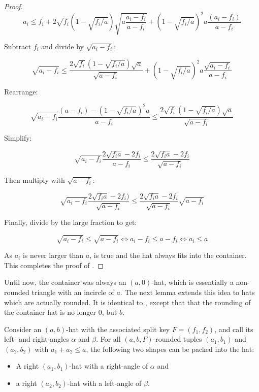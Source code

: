 \documentclass[a4paper,style=print,oneside,bibliography=totoc,nexus,lnum,extramargin]{tubsbook}
\begin{document}
\begin{proof}
    $$a_i \le f_i + 2\sqrt{f_i}(1-\sqrt{f_i/a})\sqrt{a\frac{a_i-f_i}{a-f_i}} + (1-\sqrt{f_i/a})^2a\frac{(a_i-f_i)}{a-f_i}$$

    Subtract $f_i$ and divide by $\sqrt{a_i-f_i}$:

    $$\sqrt{a_i-f_i} \le \frac{2\sqrt{f_i}(1-\sqrt{f_i/a})\sqrt{a}}{\sqrt{a-f_i}} + (1-\sqrt{f_i/a})^2a\frac{\sqrt{a_i-f_i}}{a-f_i}$$

    Rearrange:

    $$\sqrt{a_i-f_i}\frac{(a-f_i)-(1-\sqrt{f_i/a})^2a}{a-f_i} \le \frac{2\sqrt{f_i}(1-\sqrt{f_i/a})\sqrt{a}}{\sqrt{a-f_i}}$$

    Simplify:

    $$\sqrt{a_i-f_i}\frac{2\sqrt{f_ia}-2f_i}{a-f_i} \le \frac{2\sqrt{f_ia}-2f_i}{\sqrt{a-f_i}}$$

    Then multiply with $\sqrt{a-f_i}$:

    $$\sqrt{a_i-f_i}\frac{2\sqrt{f_ia}-2f_i)}{\sqrt{a-f_i}} \le \frac{2\sqrt{f_ia}-2f_i}{\sqrt{a-f_i}}\sqrt{a-f_i}$$

    Finally, divide by the large fraction to get:

    \begin{equation*}
        \sqrt{a_i-f_i} \le \sqrt{a-f_i} \iff a_i - f_i \le a - f_i \iff a_i \le a
    \end{equation*}

    As $a_i$ is never larger than $a$,  is true and the hat always fits into the container. This completes the proof of .
\end{proof}

Until now, the container was always an $(a,0)$-hat, which is essentially a non-rounded triangle with an incircle of $a$. The next lemma extends this idea to hats which are actually rounded. It is identical to , except that that the rounding of the container hat is no longer 0, but $b$.

\begin{lemma}\label{th:rounded-hats-in-hat}
    Consider an $(a,b)$-hat with the associated split key $F = (f_1, f_2)$, and call its left- and right-angles $\alpha$ and $\beta$.
    For all $(a,b,F)$-rounded tuples $(a_1, b_1)$ and $(a_2, b_2)$ with $a_1 + a_2 \le a$, the following two shapes can be packed into the hat:
    \begin{itemize}
        \item A right $(a_1,b_1)$-hat with a right-angle of $\alpha$ and
        \item a right $(a_2,b_2)$-hat with a left-angle of $\beta$.
    \end{itemize}
\end{lemma}
\end{document}

